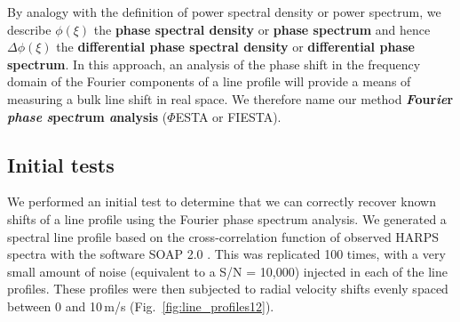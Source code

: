 By analogy with the definition of power spectral density or power spectrum, we describe $\phi(\xi)$ the \textbf{phase spectral density} or \textbf{phase spectrum} and hence $\Delta \phi(\xi)$ the \textbf{differential phase spectral density} or \textbf{differential phase spectrum}. In this approach, an analysis of the phase shift in the frequency domain of the Fourier components of a line profile will provide a means of measuring a bulk line shift in real space. We therefore name our method \textbf{\textit{F}our\textit{ie}r \textit{phase} \textit{s}pec\textit{t}rum \textit{a}nalysis} ($\Phi$ESTA or FIESTA). 



\subsection{Initial tests}
\label{sec:Initial_tests}

We performed an initial test to determine that we can correctly recover known shifts of a line profile using the Fourier phase spectrum analysis. We generated a spectral line profile based on the cross-correlation function of observed HARPS spectra with the software SOAP 2.0 \cite{Dumusque2014SOAP}. This was replicated 100 times, with a very small amount of 
noise (equivalent to a S/N = 10,000) injected in each of the line profiles. These profiles were then
subjected to radial velocity shifts evenly spaced between 0 and 10\,m/s (Fig.~\ref{fig:line_profiles12}). 

